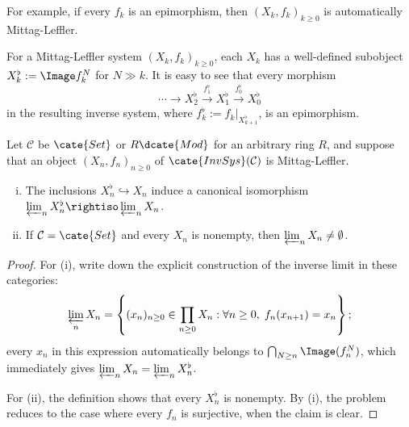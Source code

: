 For example, if every $f_k$ is an epimorphism, then
$(X_k,f_k)_{k\geq0}$ is automatically Mittag-Leffler.

For a Mittag-Leffler system $(X_k,f_k)_{k\geq0}$, each $X_k$ has a
well-defined subobject $X_k^\flat:=\Image f_k^N$ for $N\gg k$. It is easy to
see that every morphism
\[ \cdots \to X^\flat_2 \xrightarrow{f^\flat_1} X^\flat_1 \xrightarrow{f^\flat_0} X^\flat_0 \]
in the resulting inverse system, where
$f_k^\flat:=f_k|_{X_{k+1}^\flat}$, is an epimorphism.

\begin{lemma}\label{prop:ML-nonempty}
	Let $\mathcal{C}$ be $\cate{Set}$ or $R\dcate{Mod}$ for an arbitrary ring
	$R$, and suppose that an object $(X_n,f_n)_{n\geq0}$ of
	$\cate{InvSys}(\mathcal{C})$ is Mittag-Leffler.
	\begin{enumerate}[(i)]
		\item The inclusions $X_n^\flat\hookrightarrow X_n$ induce a
		canonical isomorphism
		$\varprojlim_nX_n^\flat\rightiso\varprojlim_nX_n$.
		\item If $\mathcal{C}=\cate{Set}$ and every $X_n$ is nonempty, then
		$\varprojlim_nX_n\neq\emptyset$.
	\end{enumerate}
\end{lemma}
\begin{proof}
	For (i), write down the explicit construction of the inverse limit in
	these categories:
	\[ \varprojlim_n X_n = \left\{ (x_n)_{n \geq 0} \in \prod_{n \geq 0} X_n : \forall n \geq 0,\; f_n(x_{n+1}) = x_n \right\}; \]
	every $x_n$ in this expression automatically belongs to
	$\bigcap_{N\geq n}\Image(f_n^N)$, which immediately gives
	$\varprojlim_nX_n=\varprojlim_nX_n^\flat$.

	For (ii), the definition shows that every $X_n^\flat$ is nonempty. By (i),
	the problem reduces to the case where every $f_n$ is surjective, when the
	claim is clear.
\end{proof}

